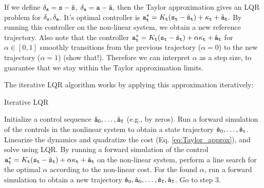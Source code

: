 If we define $\delta_{\tt s} = {\tt s} - \hat{{\tt s}}$, $\delta_{\tt a} = {\tt a} - \hat{{\tt a}}$, then the Taylor approximation gives an LQR problem for $\delta_{\tt s}, \delta_{\tt a}$. It's optimal controller is ${\tt a}_{\tt t}^* = K_{\tt t} ({\tt s}_{\tt t} - \hat{{\tt s}}_{\tt t}) + \kappa_{\tt t} + \hat{{\tt a}}_{\tt t}.$ By running this controller on the non-linear system, we obtain a new reference trajectory. 
Also note that the controller ${\tt a}_{\tt t}^* = K_{\tt t} ({\tt s}_{\tt t} - \hat{{\tt s}}_{\tt t}) + \alpha \kappa_{\tt t} + \hat{{\tt a}}_{\tt t}$ for $\alpha \in [0,1]$ smoothly transitions from the previous trajectory ($\alpha=0$) to the new trajectory ($\alpha=1$) (show that!). Therefore we can interpret $\alpha$ as a step size, to guarantee that we stay within the Taylor approximation limits.

The iterative LQR algorithm works by applying this approximation iteratively:


\begin{algorithm}
\caption{Iterative LQR}
\label{alg:nonlinear_control}
\begin{algorithmic}[1]
\State Initialize a control sequence $\hat{{\tt a}}_0, \dots, \hat{{\tt a}}_{\tt T}$ (e.g., by zeros).
\State Run a forward simulation of the controls in the nonlinear system to obtain a state trajectory $\hat{{\tt s}}_0, \dots, \hat{{\tt s}}_{\tt t}$.
\State Linearize the dynamics and quadratize the cost (Eq. \ref{eq:Taylor_approx}), and solve using LQR.
\State By running a forward simulation of the control ${\tt a}_{\tt t}^* = K_{\tt t} ({\tt s}_{\tt t} - \hat{{\tt s}}_{\tt t}) + \alpha \kappa_{\tt t} + \hat{{\tt a}}_{\tt t}$ on the non-linear system, perform a line search for the optimal $\alpha$ according to the non-linear cost.
\State For the found $\alpha$, run a forward simulation to obtain a new trajectory $\hat{{\tt s}}_0, \hat{{\tt a}}_0, \dots, \hat{{\tt s}}_{{\tt T}}, \hat{{\tt a}}_{{\tt T}}$. Go to step 3.
\end{algorithmic}
\end{algorithm}

